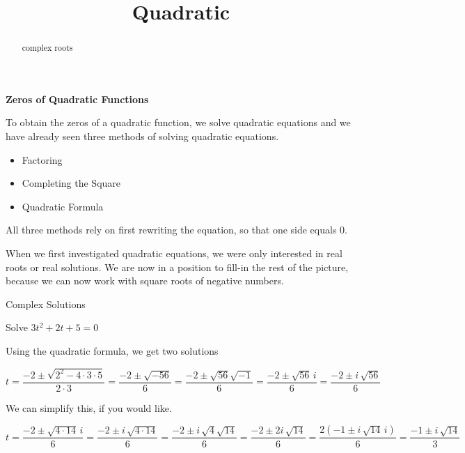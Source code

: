 \documentclass{ximera}
\title{Quadratic}
\begin{document}
\begin{abstract}
complex roots
\end{abstract}
\maketitle



\textbf{\textcolor{blue!55!black}{Zeros of Quadratic Functions}}


To obtain the zeros of a quadratic function, we solve quadratic equations and we have already seen three methods of solving quadratic equations.

\begin{itemize}
	\item Factoring
	\item Completing the Square
	\item Quadratic Formula
	\end{itemize}


All three methods rely on first rewriting the equation, so that one side equals $0$.

When we first investigated quadratic equations, we were only interested in real roots or real solutions.  We are now in a position to fill-in the rest of the picture, because we can now work with square roots of negative numbers.


\begin{example} Complex Solutions

Solve $3t^2 + 2t + 5 = 0$

Using the quadratic formula, we get two solutions

\[  t = \frac{-2 \pm \sqrt{2^2 - 4 \cdot 3 \cdot 5}}{2 \cdot 3}   =  \frac{-2 \pm \sqrt{-56}}{6}  =  \frac{-2 \pm \sqrt{56}\sqrt{-1}}{6}   =  \frac{-2 \pm \sqrt{56} \, i}{6}  =  \frac{-2 \pm i \,\sqrt{56}}{6}   \]



We can simplify this, if you would like.


\[  t = \frac{-2 \pm \sqrt{4 \cdot 14} \, i}{6}  = \frac{-2 \pm i \, \sqrt{4 \cdot 14}}{6}  =  \frac{-2 \pm i \,\sqrt{4} \sqrt{14}}{6} = \frac{-2 \pm 2 i \, \sqrt{14}}{6} = \frac{2(-1 \pm i \,\sqrt{14} \, i)}{6}   = \frac{-1 \pm i \,\sqrt{14}}{3}   \]



\end{example}
\end{document}
